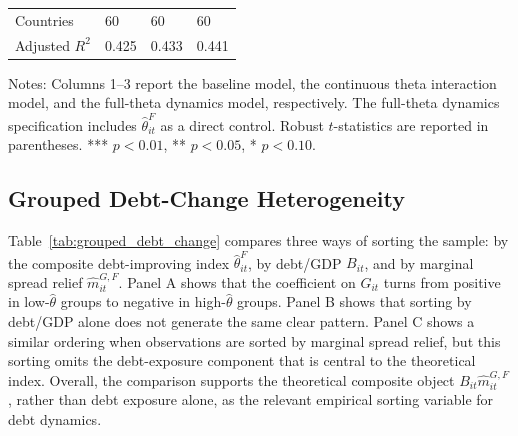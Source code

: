 \begin{table}[H]
\begin{threeparttable}
\begin{tabularx}{\textwidth}{lYYY}
Countries & 60 & 60 & 60 \\
Adjusted $R^2$ & 0.425 & 0.433 & 0.441 \\
\bottomrule
\end{tabularx}
\begin{tablenotes}[flushleft]\footnotesize
\item Notes: Columns 1--3 report the baseline model, the continuous theta interaction model, and the full-theta dynamics model, respectively. The full-theta dynamics specification includes $\widehat\theta^F_{it}$ as a direct control. Robust $t$-statistics are reported in parentheses. *** $p<0.01$, ** $p<0.05$, * $p<0.10$.
\end{tablenotes}
\end{threeparttable}
\end{table}

\subsection{Grouped Debt-Change Heterogeneity}

Table~\ref{tab:grouped_debt_change} compares three ways of sorting the sample: by the composite debt-improving index $\widehat\theta^F_{it}$, by debt/GDP $B_{it}$, and by marginal spread relief $\widehat m^{G,F}_{it}$. Panel A shows that the coefficient on $G_{it}$ turns from positive in low-$\widehat\theta$ groups to negative in high-$\widehat\theta$ groups. Panel B shows that sorting by debt/GDP alone does not generate the same clear pattern. Panel C shows a similar ordering when observations are sorted by marginal spread relief, but this sorting omits the debt-exposure component that is central to the theoretical index. Overall, the comparison supports the theoretical composite object $B_{it}\widehat m^{G,F}_{it}$, rather than debt exposure alone, as the relevant empirical sorting variable for debt dynamics.

